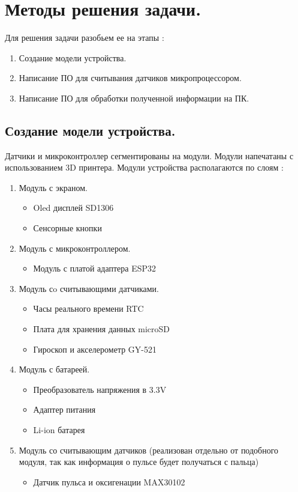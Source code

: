 \documentclass[a4document]{article}
\begin{document}
{
\newpage
\section*{Методы решения задачи.} 
\bigbreak
Для решения задачи разобьем ее на этапы : 
\begin{enumerate}
    \item Создание модели устройства.
    \item Написание ПО для считывания датчиков микропроцессором.
    \item Написание ПО для обработки полученной информации на ПК.
\end{enumerate}

\subsection*{Создание модели устройства.}
{
Датчики и микроконтроллер сегментированы на модули. Модули напечатаны с использованием 3D принтера. 
Модули устройства располагаются по слоям : 
\begin{enumerate}
    \item Модуль с экраном.
        \begin{itemize}
            \item Oled дисплей SD1306
            \item Сенсорные кнопки
        \end{itemize}
    \item Модуль с микроконтроллером.
        \begin{itemize}
            \item Модуль с платой адаптера ESP32
        \end{itemize}
    \item Модуль сo считывающими датчиками. 
        \begin{itemize}
            \item Часы реального времени RTC
            \item Плата для хранения данных microSD
            \item Гироскоп и акселерометр GY-521
        \end{itemize}
    \item Модуль с батареей.
        \begin{itemize}
            \item Преобразователь напряжения в 3.3V
            \item Адаптер питания
            \item Li-ion батарея
        \end{itemize}
    \item Модуль со считывающим датчиков (реализован отдельно от подобного модуля, 
            так как информация о пульсе будет получаться с пальца)
        \begin{itemize}
            \item Датчик пульса и оксигенации MAX30102
        \end{itemize}
\end{enumerate}

}}
\end{document}
